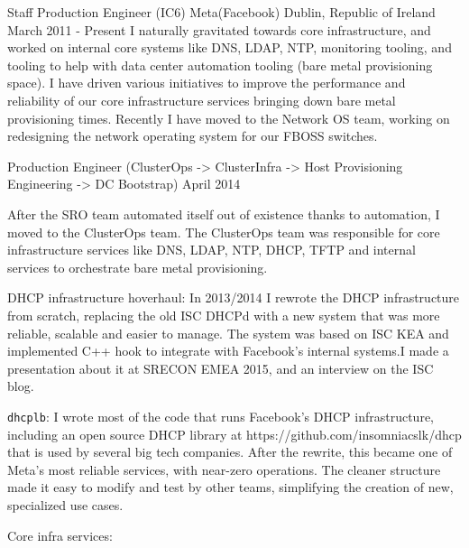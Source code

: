 

\begin{cventries}

  \cventry
  {Staff Production Engineer (IC6)} %
  {Meta(Facebook)} %
  {Dublin, Republic of Ireland} %
  {March 2011 - Present} %
  {
    I naturally gravitated towards core infrastructure, and worked on internal core systems like DNS, LDAP, NTP, monitoring tooling, and
    tooling to help with data center automation tooling (bare metal provisioning space).
    I have driven various initiatives to improve the performance and reliability of our core infrastructure services bringing
    down bare metal provisioning times.
    Recently I have moved to the Network OS team, working on redesigning the network operating system for our FBOSS switches.
  }

  \cventryprevrole
  {Production Engineer (ClusterOps -> ClusterInfra -> Host Provisioning Engineering -> DC Bootstrap)}
  {April 2014 }
  {
    After the SRO team automated itself out of existence thanks to automation, I moved to the ClusterOps team.
    The ClusterOps team was responsible for core infrastructure services like DNS, LDAP, NTP, DHCP, TFTP and internal services
    to orchestrate bare metal provisioning.
    \begin{cvitems}
      \item {DHCP infrastructure hoverhaul: In 2013/2014 I rewrote the DHCP infrastructure from scratch, replacing the old
                  ISC DHCPd with a new system that was more reliable, scalable and easier to manage. The system was based on ISC KEA
                  and implemented C++ hook to integrate with Facebook's internal systems.I made a presentation about it
                  at SRECON EMEA 2015, and an interview on the ISC blog.}
      \item \texttt{dhcplb}:  I wrote most of the code that runs Facebook’s DHCP infrastructure, including
      an open source DHCP library at https://github.com/insomniacslk/dhcp that is used by several big tech
      companies. After the rewrite, this became one of Meta’s most reliable services, with near-zero
      operations. The cleaner structure made it easy to modify and test by other teams, simplifying the
      creation of new, specialized use cases.
      \item {Core infra services:}
    \end{cvitems}
  }


\end{cventries}
